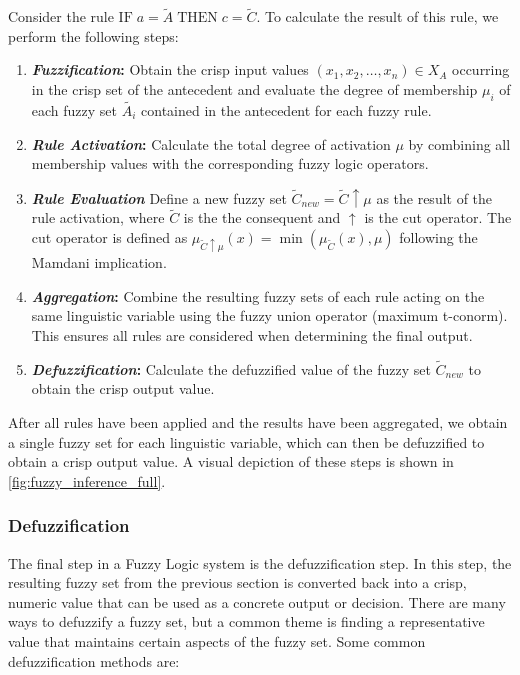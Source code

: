 Consider the rule $\text{IF} \; a = \tilde{A} \; \text{THEN} \; c = \tilde{C}$. To calculate the result of this rule, we perform the following steps:

\begin{enumerate}
      \item \textbf{\emph{Fuzzification}:} Obtain the crisp input values $(x_1, x_2, \ldots, x_n) \in X_{A}$ occurring in the crisp set of the antecedent and evaluate the degree of membership $\mu_i$ of each fuzzy set $\tilde{A_i}$ contained in the antecedent for each fuzzy rule.
      \item \textbf{\emph{Rule Activation}:} Calculate the total degree of activation $\mu$ by combining all membership values with the corresponding fuzzy logic operators.
      \item \textbf{\emph{Rule Evaluation}} Define a new fuzzy set $\tilde{C}_{new}=\tilde{C}\uparrow \mu$ as the result of the rule activation, where $\tilde{C}$ is the the consequent and $\uparrow$ is the cut operator. The cut operator is defined as $\mu_{\tilde{C}\uparrow \mu}(x) = \min(\mu_{\tilde{C}}(x), \mu)$ following the Mamdani implication.
      \item \textbf{\emph{Aggregation}:}  Combine the resulting fuzzy sets of each rule acting on the same linguistic variable using the fuzzy union operator (maximum t-conorm). This ensures all rules are considered when determining the final output.
      \item \textbf{\emph{Defuzzification}:} Calculate the defuzzified value of the fuzzy set $\tilde{C}_{new}$ to obtain the crisp output value.
\end{enumerate}

After all rules have been applied and the results have been aggregated, we obtain a single fuzzy set for each linguistic variable, which can then be defuzzified to obtain a crisp output value. A visual depiction of these steps is shown in \autoref{fig:fuzzy_inference_full}.

\subsubsection{Defuzzification}

The final step in a Fuzzy Logic system is the defuzzification step. In this step, the resulting fuzzy set from the previous section is converted back into a crisp, numeric value that can be used as a concrete output or decision. There are many ways to defuzzify a fuzzy set, but a common theme is finding a representative value that maintains certain aspects of the fuzzy set. Some common defuzzification methods are:


